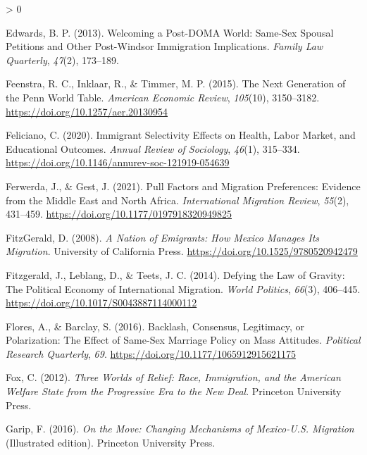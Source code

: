 \documentclass[
  11pt,
]{article}
\newlength{\cslhangindent}
\newenvironment{CSLReferences}[2] %
 {%
  \setlength{\parindent}{0pt}
  \ifodd #1 \everypar{\setlength{\hangindent}{\cslhangindent}}\ignorespaces\fi
  \ifnum #2 > 0
  \setlength{\parskip}{#2\baselineskip}
  \fi
 }%
 {}
\begin{document}
\begin{CSLReferences}{1}{0}
\leavevmode\hypertarget{ref-edwards_2013}{}%
Edwards, B. P. (2013). Welcoming a {Post}-{DOMA World}: {Same}-{Sex Spousal Petitions} and {Other Post}-{Windsor Immigration Implications}. \emph{Family Law Quarterly}, \emph{47}(2), 173--189.

\leavevmode\hypertarget{ref-feenstra_2015}{}%
Feenstra, R. C., Inklaar, R., \& Timmer, M. P. (2015). The {Next Generation} of the {Penn World Table}. \emph{American Economic Review}, \emph{105}(10), 3150--3182. \url{https://doi.org/10.1257/aer.20130954}

\leavevmode\hypertarget{ref-feliciano_2020}{}%
Feliciano, C. (2020). Immigrant {Selectivity Effects} on {Health}, {Labor Market}, and {Educational Outcomes}. \emph{Annual Review of Sociology}, \emph{46}(1), 315--334. \url{https://doi.org/10.1146/annurev-soc-121919-054639}

\leavevmode\hypertarget{ref-ferwerda_2021_pull}{}%
Ferwerda, J., \& Gest, J. (2021). Pull {Factors} and {Migration Preferences}: {Evidence} from the {Middle East} and {North Africa}. \emph{International Migration Review}, \emph{55}(2), 431--459. \url{https://doi.org/10.1177/0197918320949825}

\leavevmode\hypertarget{ref-fitzgerald_2008}{}%
FitzGerald, D. (2008). \emph{A {Nation} of {Emigrants}: {How Mexico Manages Its Migration}}. {University of California Press}. \url{https://doi.org/10.1525/9780520942479}

\leavevmode\hypertarget{ref-fitzgerald_2014}{}%
Fitzgerald, J., Leblang, D., \& Teets, J. C. (2014). Defying the {Law} of {Gravity}: {The Political Economy} of {International Migration}. \emph{World Politics}, \emph{66}(3), 406--445. \url{https://doi.org/10.1017/S0043887114000112}

\leavevmode\hypertarget{ref-flores_2016_backlash}{}%
Flores, A., \& Barclay, S. (2016). Backlash, {Consensus}, {Legitimacy}, or {Polarization}: {The Effect} of {Same}-{Sex Marriage Policy} on {Mass Attitudes}. \emph{Political Research Quarterly}, \emph{69}. \url{https://doi.org/10.1177/1065912915621175}

\leavevmode\hypertarget{ref-fox_2012}{}%
Fox, C. (2012). \emph{Three {Worlds} of {Relief}: {Race}, {Immigration}, and the {American Welfare State} from the {Progressive Era} to the {New Deal}}. {Princeton University Press}.

\leavevmode\hypertarget{ref-garip_2016}{}%
Garip, F. (2016). \emph{On the {Move}: {Changing Mechanisms} of {Mexico}-{U}.{S}. {Migration}} (Illustrated edition). {Princeton University Press}.


\end{CSLReferences}
\end{document}
